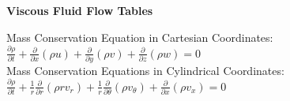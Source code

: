 \documentclass[oneside,onecolumn,a4paper,10pt,notitlepage]{tables}
\newcommand{\mfd}{\displaystyle}
\begin{document}
\pagestyle{empty}

\begin{center}
\Huge \bf{Viscous Fluid Flow Tables}
\end{center}
\vfill
\vfill
Mass Conservation Equation in Cartesian Coordinates:\\[0.5em]
$\mfd \frac{\partial \rho}{\partial t} + \frac{\partial }{\partial x}(\rho u) +  \frac{\partial }{\partial y}(\rho v) +  \frac{\partial }{\partial z}(\rho w) 
=
0
$\\
\vfill
Mass Conservation Equations in Cylindrical Coordinates:\\[0.3em]
$\mfd
\frac{\partial \rho}{\partial t} + \frac{1}{r} \frac{\partial }{\partial r} (\rho r v_r) + \frac{1}{r} \frac{\partial }{\partial \theta}(\rho v_\theta) +  \frac{\partial}{\partial x}(\rho v_x)=0
$\\
\end{document}
